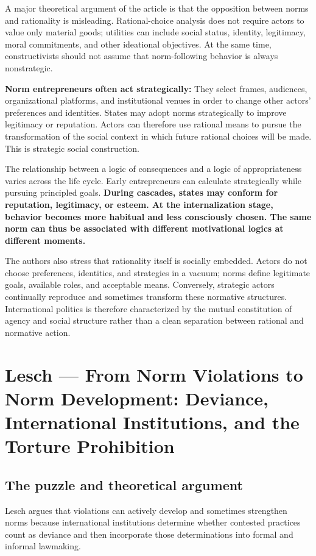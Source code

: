 A major theoretical argument of the article is that the opposition between norms and rationality is misleading. Rational-choice analysis does not require actors to value only material goods; utilities can include social status, identity, legitimacy, moral commitments, and other ideational objectives. At the same time, constructivists should not assume that norm-following behavior is always nonstrategic.

\textbf{Norm entrepreneurs often act strategically:} They select frames, audiences, organizational platforms, and institutional venues in order to change other actors' preferences and identities. States may adopt norms strategically to improve legitimacy or reputation. Actors can therefore use rational means to pursue the transformation of the social context in which future rational choices will be made. This is strategic social construction.

The relationship between a logic of consequences and a logic of appropriateness varies across the life cycle. Early entrepreneurs can calculate strategically while pursuing principled goals. \textbf{During cascades, states may conform for reputation, legitimacy, or esteem. At the internalization stage, behavior becomes more habitual and less consciously chosen. The same norm can thus be associated with different motivational logics at different moments.}

The authors also stress that rationality itself is socially embedded. Actors do not choose preferences, identities, and strategies in a vacuum; norms define legitimate goals, available roles, and acceptable means. Conversely, strategic actors continually reproduce and sometimes transform these normative structures. International politics is therefore characterized by the mutual constitution of agency and social structure rather than a clean separation between rational and normative action.

\clearpage
\section{Lesch --- From Norm Violations to Norm Development: Deviance, International Institutions, and the Torture Prohibition}

\subsection{The puzzle and theoretical argument}

Lesch argues that violations can actively develop and sometimes strengthen norms because international institutions determine whether contested practices count as deviance and then incorporate those determinations into formal and informal lawmaking.

